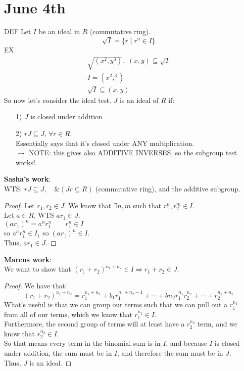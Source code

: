 \documentclass[10pt,oneside]{article}
\newcommand{\vp}{\vspace{0.15cm}\\}
\newcommand{\vpp}{\vspace{0.25cm}\\}
\begin{document}
\section*{June 4th}
DEF Let $I$ be an ideal in $R$ (commutative ring).
$$\sqrt I = \{r\mid r^n\in I\}$$
\color{red}
EX 
\begin{align*}
    \sqrt{(x^2,y^3)}, \; (x,y)\subseteq \sqrt I\\
    I = (x^2,^3)\\
    \sqrt I \subseteq (x,y)
\end{align*}
\color{blue}
So now let's consider the ideal test. 
$J$ is an ideal of $R$ if:
\begin{enumerate}
    \item [1)]$J$ is closed under addition
    \item [2)]$rJ\subseteq J$, $\forall r \in R$. \\
        Essentially says that it's closed under ANY multiplication.\\
        \color{darkgreen}$\rightarrow $ NOTE: this gives also ADDITIVE INVERSES, so the subgroup test works!.
\end{enumerate}
\color{sasha}
\textbf{Sasha's work}:\vpp
WTS: $rJ\subseteq J,\quad \&(Jr\subseteq R)$ (commutative ring), and the additive subgroup.
\begin{proof}
    Let $r_1,r_2\in J$. We know that $\exists n,m$ such that $r_1^n, r_2^m \in I$. \vp
    Let $a\in R$, WTS $ar_1\in J$.\vp
    $(ar_1)^n=a^nr_1^n\quad\quad r_1^n\in I$\vp
    so $a^nr_1^n \in I_1$ so $(ar_1)^n\in I$.\vp
    Thus, $ar_1\in J$.
\end{proof}
\color{marcus}
\textbf{Marcus work}:\vpp
We want to show that $(r_1+r_2)^{n_1+n_2}\in I\Rightarrow r_1+r_2\in J$.
\begin{proof}
    We have that: 
    $$(r_1+r_2)^{n_1+n_2}=r_1^{n_1+n_2}+b_1r_1^{n_1+n_2-1}+\cdots+b{n_2}r_1^{n_1}r_2^{n_2}+\cdots+r_2^{n_1+n_2}$$
    What's useful is that we can group our terms such that we can pull out a $r_1^{n_1}$ from all of our terms, which we know that $r_1^{n_1}\in I$. \vp
    Furthermore, the second group of terms will at least have a $r_2^{n_2}$ term, and we know that $r_2^{n_2}\in I$. \vp
    So that means every term in the binomial sum is in $I$, and because $I$ is closed under addition, the sum must be in $I$, and therefore the sum must be in $J$. \vp
    Thus, $J$ is an ideal. 
\end{proof}
\color{black}
\newpage
\end{document}
